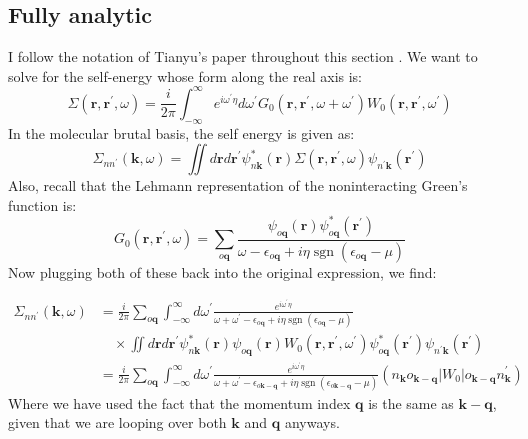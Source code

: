\subsection{Fully analytic}
I follow the notation of Tianyu's paper throughout this section \cite{Zhu2020-nt}.
    We want to solve for the self-energy whose form along the real axis is:
    \begin{equation}
    \Sigma\left(\mathbf{r}, \mathbf{r}^{\prime}, \omega\right)=\frac{i}{2 \pi} \int_{-\infty}^{\infty} e^{i\omega ^{\prime}\eta }d \omega^{\prime} G_{0}\left(\mathbf{r}, \mathbf{r}^{\prime}, \omega+\omega^{\prime}\right) W_{0}\left(\mathbf{r}, \mathbf{r}^{\prime}, \omega^{\prime}\right)
    \end{equation}
    In the molecular brutal basis, the self energy is given as:
    \begin{equation}
        \Sigma_{n n^\prime}(\mathbf{k}, \omega) = \iint d \mathbf{r} d \mathbf{r}^\prime \psi_{n\mathbf{k}}^{*}(\mathbf{r}) \Sigma(\mathbf{r}, \mathbf{r}^\prime, \omega) \psi_{n^\prime\mathbf{k}}(\mathbf{r}^\prime)
    \end{equation}
    Also, recall that the Lehmann representation of the noninteracting Green's function is:
    \begin{equation}
        G_0\left(\mathbf{r}, \mathbf{r}^{\prime}, \omega\right)=\sum_{o \mathbf{q} } \frac{\psi_{o \mathbf{q}}(\mathbf{r}) \psi_{o \mathbf{q}}^{*}\left(\mathbf{r}^{\prime}\right)}{\omega-\epsilon_{o \mathbf{q}}+i \eta \operatorname{sgn}\left(\epsilon_{o \mathbf{q}}-\mu\right)}
    \end{equation}
    Now plugging both of these back into the original expression, we find:


    \begin{align}
        \Sigma_{n n^\prime}(\mathbf{k}, \omega) &= \frac{i}{2 \pi} \sum_{o \mathbf{q}} \int_{-\infty}^{\infty} d \omega^{\prime} \frac{e^{i\omega ^{\prime}\eta }}{\omega + \omega^{\prime} - \epsilon_{o \mathbf{q}} + i \eta \operatorname{sgn}\left(\epsilon_{o \mathbf{q}}-\mu\right)} \nonumber \\
        &\quad \times \iint d \mathbf{r} d \mathbf{r}^\prime \psi_{n\mathbf{k}}^{*}(\mathbf{r}) \psi_{o \mathbf{q}}(\mathbf{r}) W_0(\mathbf{r}, \mathbf{r}^\prime, \omega^{\prime}) \psi_{o \mathbf{q}}^{*}\left(\mathbf{r}^{\prime}\right) \psi_{n^\prime\mathbf{k}}(\mathbf{r}^\prime)\\
        &= \frac{i}{2 \pi} \sum_{o \mathbf{q}} \int_{-\infty}^{\infty} d \omega^{\prime} \frac{e^{i\omega ^{\prime}\eta }}{\omega + \omega^{\prime} - \epsilon_{o \mathbf{k}-\mathbf{q}} + i \eta \operatorname{sgn}\left(\epsilon_{o \mathbf{k}-\mathbf{q}}-\mu\right)} (n_{\mathbf{k}}o_{\mathbf{k-q}}|W_0|o_{\mathbf{k-q}}n^\prime_{\mathbf{k}})
    \end{align}
    Where we have used the fact that the momentum index $\mathbf{q}$ is the same as $\mathbf{k}-\mathbf{q}$, given that we are looping over both $\mathbf{k}$ and $\mathbf{q}$ anyways.



